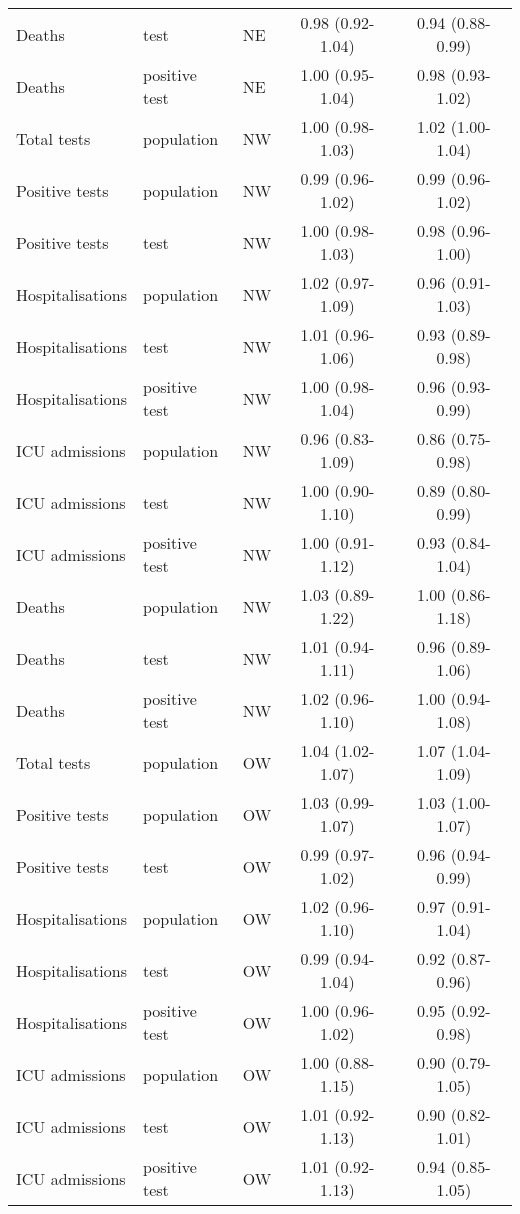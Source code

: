 \documentclass{article}
\begin{document}
\begin{longtable}{lllcc}
		Deaths & test & NE & 0.98 (0.92-1.04) & 0.94 (0.88-0.99) \\ 
		Deaths & positive test & NE & 1.00 (0.95-1.04) & 0.98 (0.93-1.02) \\ 
		Total tests & population & NW & 1.00 (0.98-1.03) & 1.02 (1.00-1.04) \\ 
		Positive tests & population & NW & 0.99 (0.96-1.02) & 0.99 (0.96-1.02) \\ 
		Positive tests & test & NW & 1.00 (0.98-1.03) & 0.98 (0.96-1.00) \\ 
		Hospitalisations & population & NW & 1.02 (0.97-1.09) & 0.96 (0.91-1.03) \\ 
		Hospitalisations & test & NW & 1.01 (0.96-1.06) & 0.93 (0.89-0.98) \\ 
		Hospitalisations & positive test & NW & 1.00 (0.98-1.04) & 0.96 (0.93-0.99) \\ 
		ICU admissions & population & NW & 0.96 (0.83-1.09) & 0.86 (0.75-0.98) \\ 
		ICU admissions & test & NW & 1.00 (0.90-1.10) & 0.89 (0.80-0.99) \\ 
		ICU admissions & positive test & NW & 1.00 (0.91-1.12) & 0.93 (0.84-1.04) \\ 
		Deaths & population & NW & 1.03 (0.89-1.22) & 1.00 (0.86-1.18) \\ 
		Deaths & test & NW & 1.01 (0.94-1.11) & 0.96 (0.89-1.06) \\ 
		Deaths & positive test & NW & 1.02 (0.96-1.10) & 1.00 (0.94-1.08) \\ 
		Total tests & population & OW & 1.04 (1.02-1.07) & 1.07 (1.04-1.09) \\ 
		Positive tests & population & OW & 1.03 (0.99-1.07) & 1.03 (1.00-1.07) \\ 
		Positive tests & test & OW & 0.99 (0.97-1.02) & 0.96 (0.94-0.99) \\ 
		Hospitalisations & population & OW & 1.02 (0.96-1.10) & 0.97 (0.91-1.04) \\ 
		Hospitalisations & test & OW & 0.99 (0.94-1.04) & 0.92 (0.87-0.96) \\ 
		Hospitalisations & positive test & OW & 1.00 (0.96-1.02) & 0.95 (0.92-0.98) \\ 
		ICU admissions & population & OW & 1.00 (0.88-1.15) & 0.90 (0.79-1.05) \\ 
		ICU admissions & test & OW & 1.01 (0.92-1.13) & 0.90 (0.82-1.01) \\ 
		ICU admissions & positive test & OW & 1.01 (0.92-1.13) & 0.94 (0.85-1.05) \\ 

\end{longtable}
\end{document}
